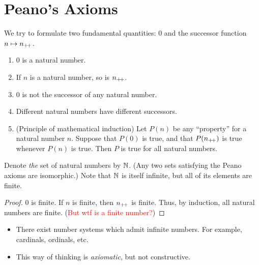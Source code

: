 \chapter{Peano's Axioms} \label{sec:peano}
We try to formulate two fundamental quantities: $0$ and the successor function
$n \mapsto n_{+\!+}$.
\begin{enumerate}[label=(P\arabic*)]
    \item $0$ is a natural number. \label{peano:0}
    \item If $n$ is a natural number, so is $n_{+\!+}$. \label{peano:closure}
    \item $0$ is not the successor of any natural number.
    \label{peano:no_predecessor}
    \item Different natural numbers have different successors.
    \label{peano:injection}
    \item (Principle of mathematical induction) Let $P(n)$ be any ``property''
    for a natural number $n$.
    Suppose that $P(0)$ is true, and that $P(n_{+\!+})$ is true whenever $P(n)$ is
    true.
    Then $P$ is true for all natural numbers.
    \label{peano:induction}
\end{enumerate}
Denote \emph{the} set of natural numbers by $\mathbb{N}$.
(Any two sets satisfying the Peano axioms are isomorphic.)
Note that $\mathbb{N}$ is itself infinite, but all of its elements are finite.
\begin{proof}
    $0$ is finite.
    If $n$ is finite, then $n_{+\!+}$ is finite.
    Thus, by induction, all natural numbers are finite.
    (\textcolor{Red}{But wtf is a finite number?})
\end{proof}
\begin{remark} \leavevmode
    \begin{itemize}
        \item There exist number systems which admit infinite numbers.
        For example, cardinals, ordinals, etc.
        \item This way of thinking is \textit{axiomatic}, but not constructive.
    \end{itemize}
\end{remark}
